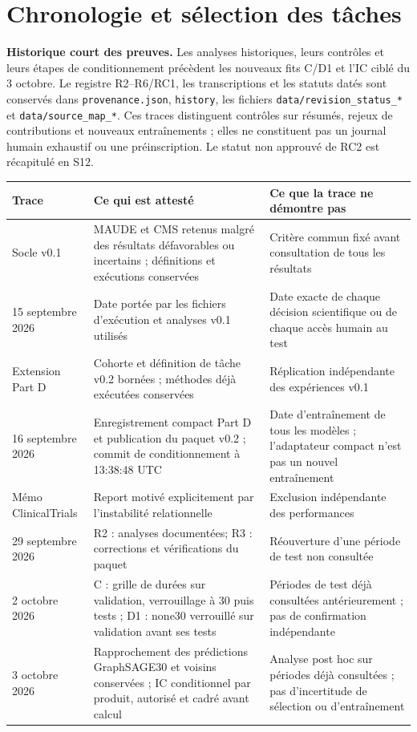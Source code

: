 \documentclass[10pt,a4paper]{article}
\newcommand{\src}[1]{{\small\nolinkurl{#1}}}
\begin{document}
\section{Chronologie et sélection des tâches}
\label{supp:chronology}
\textbf{Historique court des preuves.} Les analyses historiques, leurs contrôles et leurs étapes de conditionnement précèdent les nouveaux fits C/D1 et l'IC ciblé du 3 octobre. Le registre R2--R6/RC1, les transcriptions et les statuts datés sont conservés dans \src{provenance.json}, \src{history}, les fichiers \src{data/revision_status_*} et \src{data/source_map_*}. Ces traces distinguent contrôles sur résumés, rejeux de contributions et nouveaux entraînements ; elles ne constituent pas un journal humain exhaustif ou une préinscription. Le statut non approuvé de RC2 est récapitulé en S12.
\begin{tabularx}{\linewidth}{@{}p{30mm}Xp{39mm}@{}}
\toprule
Trace & Ce qui est attesté & Ce que la trace ne démontre pas\\
\midrule
Socle v0.1 & MAUDE et CMS retenus malgré des résultats défavorables ou incertains ; définitions et exécutions conservées & Critère commun fixé avant consultation de tous les résultats\\
15 septembre 2026 & Date portée par les fichiers d'exécution et analyses v0.1 utilisés & Date exacte de chaque décision scientifique ou de chaque accès humain au test\\
Extension Part D & Cohorte et définition de tâche v0.2 bornées ; méthodes déjà exécutées conservées & Réplication indépendante des expériences v0.1\\
16 septembre 2026 & Enregistrement compact Part D et publication du paquet v0.2 ; commit de conditionnement à 13:38:48 UTC & Date d'entraînement de tous les modèles ; l'adaptateur compact n'est pas un nouvel entraînement\\
Mémo ClinicalTrials & Report motivé explicitement par l'instabilité relationnelle & Exclusion indépendante des performances\\
29 septembre 2026 & R2 : analyses documentées; R3 : corrections et vérifications du paquet & Réouverture d'une période de test non consultée\\
2 octobre 2026 & C : grille de durées sur validation, verrouillage à 30 puis tests ; D1 : none30 verrouillé sur validation avant ses tests & Périodes de test déjà consultées antérieurement ; pas de confirmation indépendante\\
3 octobre 2026 & Rapprochement des prédictions GraphSAGE30 et voisins conservées ; IC conditionnel par produit, autorisé et cadré avant calcul & Analyse post hoc sur périodes déjà consultées ; pas d'incertitude de sélection ou d'entraînement\\
\bottomrule
\end{tabularx}
\end{document}
